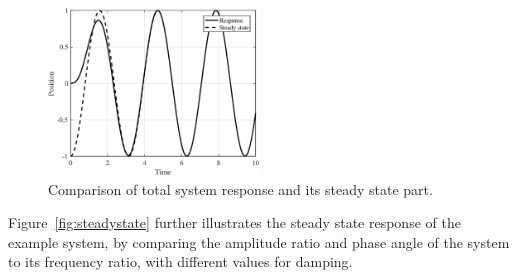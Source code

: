 \documentclass{article}
\begin{document}
	\begin{figure}[htb]
		\centering
		\includegraphics[width=0.5\textwidth]{response.eps}
		\caption{Comparison of total system response and its steady state part.}
		\label{fig:response}
	\end{figure}
	
	Figure~\ref{fig:steadystate} further illustrates the steady state response of the example system, by comparing the amplitude ratio and phase angle of the system to its frequency ratio, with different values for damping.
	
\end{document}
